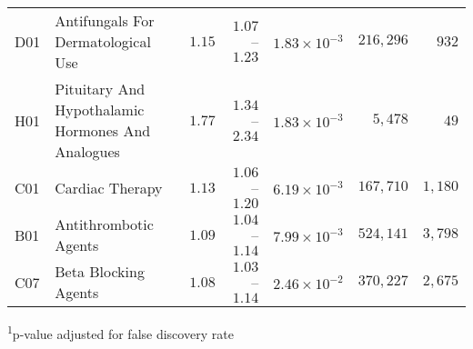 \begin{longtable}{llrrrrr}
D01 & Antifungals For Dermatological Use & $1.15$ & $1.07$–$1.23$ & $1.83 \times 10^{-3}$ & $216,296$ & $932$ \\ 
H01 & Pituitary And Hypothalamic Hormones And Analogues & $1.77$ & $1.34$–$2.34$ & $1.83 \times 10^{-3}$ & $5,478$ & $49$ \\ 
C01 & Cardiac Therapy & $1.13$ & $1.06$–$1.20$ & $6.19 \times 10^{-3}$ & $167,710$ & $1,180$ \\ 
B01 & Antithrombotic Agents & $1.09$ & $1.04$–$1.14$ & $7.99 \times 10^{-3}$ & $524,141$ & $3,798$ \\ 
C07 & Beta Blocking Agents & $1.08$ & $1.03$–$1.14$ & $2.46 \times 10^{-2}$ & $370,227$ & $2,675$ \\ 
\bottomrule
\end{longtable}
\begin{minipage}{\linewidth}
\textsuperscript{1}p-value adjusted for false discovery rate\\
\end{minipage}

